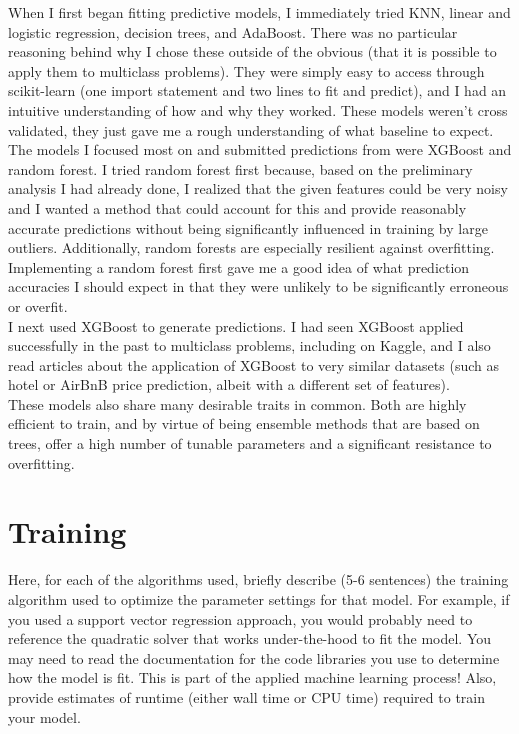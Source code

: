 \documentclass[12pt]{article}
\newtheorem{Proof of Lemma}{Proof of Lemma}
\begin{document}
When I first began fitting predictive models, I immediately tried KNN, linear and logistic regression, decision trees, and AdaBoost. There was no particular reasoning behind why I chose these outside of the obvious (that it is possible to apply them to multiclass problems). They were simply easy to access through scikit-learn (one import statement and two lines to fit and predict), and I had an intuitive understanding of how and why they worked. These models weren't cross validated, they just gave me a rough understanding of what baseline to expect. \\

The models I focused most on and submitted predictions from were XGBoost and random forest. I tried random forest first because, based on the preliminary analysis I had already done, I realized that the given features could be very noisy and I wanted a method that could account for this and provide reasonably accurate predictions without being significantly influenced in training by large outliers. Additionally, random forests are especially resilient against overfitting. Implementing a random forest first gave me a good idea of what prediction accuracies I should expect in that they were unlikely to be significantly erroneous or overfit. \\

I next used XGBoost to generate predictions. I had seen XGBoost applied successfully in the past to multiclass problems, including on Kaggle, and I also read articles about the application of XGBoost to very similar datasets (such as hotel or AirBnB price prediction, albeit with a different set of features). \\

These models also share many desirable traits in common. Both are highly efficient to train, and by virtue of being ensemble methods that are based on trees, offer a high number of tunable parameters and a significant resistance to overfitting.

\section{Training}
Here, for each of the algorithms used, briefly describe (5-6 sentences) the training algorithm used to optimize the parameter settings for that model. For example, if you used a support vector regression approach, you would probably need to reference the quadratic solver that works under-the-hood to fit the model. You may need to read the documentation for the code libraries you use to determine how the model is fit. This is part of the applied machine learning process! Also, provide estimates of runtime (either wall time or CPU time) required to train your model. \\
\end{document}
